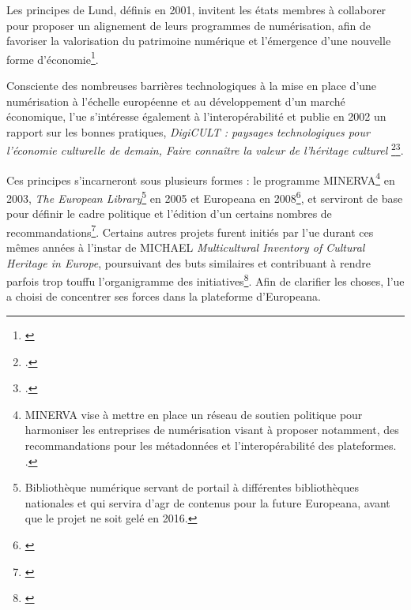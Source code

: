 Les principes de Lund, définis en 2001, invitent les états membres à collaborer pour proposer un alignement de leurs programmes de numérisation, afin de favoriser la valorisation du patrimoine numérique et l'émergence d'une nouvelle forme d'économie\footnote{\cite{foulonneau_recherche_2003}}.

Consciente des nombreuses barrières technologiques à la mise en place d'une numérisation à l'échelle européenne et au développement d'un marché économique, l'\gls{ue} s'intéresse également à l'interopérabilité et publie en 2002 un rapport sur les bonnes pratiques, \textit{DigiCULT : paysages technologiques pour l'économie culturelle de demain, Faire connaître la valeur de l'héritage culturel}  \footcite{salzburg_research_forschungsgesellschaft_digicult_2002}\footcite{thylstrup_politics_2018}. 
 
Ces principes s'incarneront sous plusieurs formes : le programme MINERVA\footnote{MINERVA vise à mettre en place un réseau de soutien politique pour harmoniser les entreprises de numérisation visant à proposer notamment, des recommandations pour les métadonnées et l'interopérabilité des plateformes. \cite{claerr_manuel_2011}.} en 2003, \textit{The European Library}\footnote{Bibliothèque numérique servant de portail à différentes bibliothèques nationales et qui servira d'\gls{agr} de contenus pour la future Europeana, avant que le projet ne soit gelé en 2016.} en 2005 et Europeana en 2008\footnote{\cite{coutts_stepping_2017}}, et serviront de base pour définir le cadre politique et l'édition d'un certains nombres de recommandations\footnote{\cite{noauthor_commission_2011}}. Certains autres projets furent initiés par l'\gls{ue} durant ces mêmes années à l'instar de MICHAEL \textit{Multicultural Inventory of Cultural Heritage in Europe}, poursuivant des buts similaires et contribuant à rendre parfois trop touffu l'organigramme des initiatives\footnote{\cite{association_pour_le_patrimoine_naturel_et_culturel_du_canton_de_vaud_patrimoine_2012}}. Afin de clarifier les choses, l'\gls{ue} a choisi de concentrer ses forces dans la plateforme d'Europeana.

